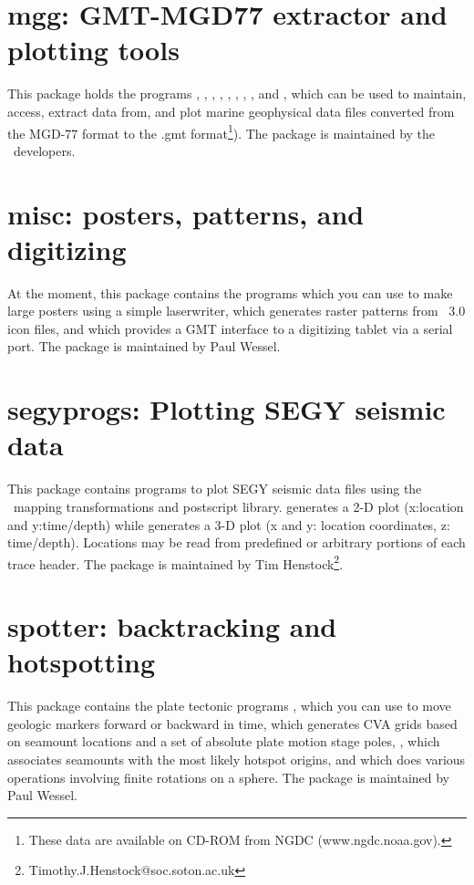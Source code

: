 \section{mgg: GMT-MGD77 extractor and plotting tools}

This package holds the programs , ,
, , , ,
, , and , which can be
used to maintain, access, extract data from, and plot marine geophysical
data files converted from the MGD-77 format to the .gmt format\footnote{These data are available on CD-ROM from NGDC
(www.ngdc.noaa.gov).}). The package is maintained by the \GMT\ developers.

\section{misc: posters, patterns, and digitizing}

At the moment, this package contains the programs 
which you can use to make large posters using a simple laserwriter,
 which generates raster patterns from \GMT\ 3.0
icon files, and  which provides a GMT interface
to a digitizing tablet via a serial port.  The package is maintained by Paul Wessel.

\section{segyprogs: Plotting SEGY seismic data}

This package contains programs to plot SEGY seismic data files using
the \GMT\ mapping transformations and postscript library.  generates
a 2-D plot (x:location and y:time/depth) while  generates a
3-D plot (x and y: location coordinates, z: time/depth). Locations may be
read from predefined or arbitrary portions of each trace header.
The package is maintained by Tim Henstock\footnote{Timothy.J.Henstock@soc.soton.ac.uk}.

\section{spotter: backtracking and hotspotting}

This package contains the plate tectonic programs ,
which you can use to move geologic markers forward or backward in time, 
 which generates CVA grids based on seamount locations
and a set of absolute plate motion stage poles, ,
which associates seamounts with the most likely hotspot origins, and 
which does various operations involving finite rotations on a sphere.  The package
is maintained by Paul Wessel.

